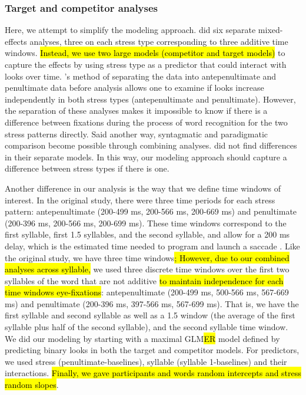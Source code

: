 \subsubsection{Target and competitor analyses}
Here, we attempt to simplify the modeling approach. \cite{Sulpizio_McQueen_2012} did six separate mixed-effects analyses, three on each stress type corresponding to three additive time windows. \hl{Instead, we use two large models (competitor and target models)} to capture the effects by using stress type as a predictor that could interact with looks over time. \cite{Sulpizio_McQueen_2012}'s method of separating the data into antepenultimate and penultimate data before analysis allows one to examine if looks increase independently in both stress types (antepenultimate and penultimate). However, the separation of these analyses makes it impossible to know if there is a difference between fixations during the process of word recognition for the two stress patterns directly. Said another way, syntagmatic and paradigmatic comparison become possible through combining analyses. \cite{Sulpizio_McQueen_2012} did not find differences in their separate models. In this way, our modeling approach should capture a difference between stress types if there is one. 

Another difference in our analysis is the way that we define time windows of interest. In the original study, there were three time periods for each stress pattern: antepenultimate (200-499 ms, 200-566 ms, 200-669 ms) and penultimate (200-396 ms, 200-566 ms, 200-699 ms). These time windows correspond to the first syllable, first 1.5 syllables, and the second syllable, and allow for a 200 ms delay, which is the estimated time needed to program and launch a saccade \citep{Matin_Shao_Boff_1993}. Like the original study, we have three time windows\hl{; However, due to our combined analyses across syllable,} we used three discrete time windows over the first two syllables of the word that are not additive \hl{to maintain independence for each time windows eye-fixations}: antepenultimate (200-499 ms, 500-566 ms, 567-669 ms) and penultimate (200-396 ms, 397-566 ms, 567-699 ms). That is, we have the first syllable and second syllable as well as a 1.5 window (the average of the first syllable plus half of the second syllable), and the second syllable time window. We did our modeling by starting with a maximal GLM\hl{ER} model defined by predicting binary looks \citep{Barr_2008} in both the target and competitor models. For predictors, we used stress (penultimate-baselines), syllable (syllable 1-baselines) and their interactions. \hl{Finally, we gave participants and words random intercepts and stress random slopes}.

